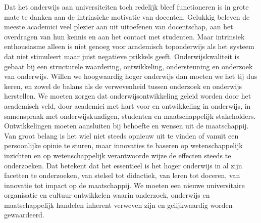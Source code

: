 \documentclass[smallauthor, chapterhaspagenum, nochapterinheader, pagenuminheader,  bigchapnum,medium2, tocpages,  garamond, titleinheader]{jote-book}
\begin{document}
	Dat het onderwijs aan universiteiten toch redelijk bleef functioneren is in grote mate te danken aan de intrinsieke motivatie van docenten. Gelukkig beleven de meeste academici veel plezier aan uit uitoefenen van docentschap, aan het overdragen van hun kennis en aan het contact met studenten. Maar intrinsiek enthousiasme alleen is niet genoeg voor academisch toponderwijs als het systeem dat niet stimuleert maar juist negatieve prikkels geeft. Onderwijskwaliteit is gebaat bij een structurele waardering, ontwikkeling, ondersteuning en onderzoek van onderwijs. Willen we hoogwaardig hoger onderwijs dan moeten we het tij dus keren, en zowel de balans als de verwevenheid tussen onderzoek en onderwijs herstellen. We moeten zorgen dat onderwijsontwikkeling geleid worden door het academisch veld, door academici met hart voor en ontwikkeling in onderwijs, in samenspraak met onderwijskundigen, studenten en maatschappelijk stakeholders. Ontwikkelingen moeten aansluiten bij behoefte en wensen uit de maatschappij. Van groot belang is het wiel niet steeds opnieuw uit te vinden of vanuit een persoonlijke opinie te sturen, maar innovaties te baseren op wetenschappelijk inzichten en op wetenschappelijk verantwoorde wijze de effecten steeds te onderzoeken. Dat betekent dat het essentieel is het hoger onderwijs in al zijn facetten te onderzoeken, van stelsel tot didactiek, van leren tot doceren, van innovatie tot impact op de maatschappij. We moeten een nieuwe universitaire organisatie en cultuur ontwikkelen waarin onderzoek, onderwijs en maatschappelijk handelen inherent verweven zijn en gelijkwaardig worden gewaardeerd.
\end{document}
